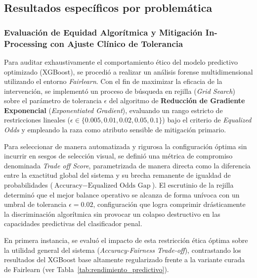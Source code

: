 \documentclass[11pt,a4paper]{article}
\begin{document}
\subsection{Resultados específicos por problemática}
\subsubsection{Evaluación de Equidad Algorítmica y Mitigación In-Processing con Ajuste Clínico de Tolerancia}
\label{subsubsec:resultados_fairness}

Para auditar exhaustivamente el comportamiento ético del modelo predictivo optimizado (XGBoost), se procedió a realizar un análisis forense multidimensional utilizando el entorno \textit{Fairlearn}. Con el fin de maximizar la eficacia de la intervención, se implementó un proceso de búsqueda en rejilla (\textit{Grid Search}) sobre el parámetro de tolerancia $\epsilon$ del algoritmo de \textbf{Reducción de Gradiente Exponencial} (\textit{Exponentiated Gradient}), evaluando un rango estricto de restricciones lineales ($\epsilon \in \{0.005, 0.01, 0.02, 0.05, 0.1\}$) bajo el criterio de \textit{Equalized Odds} y empleando la raza como atributo sensible de mitigación primario.

Para seleccionar de manera automatizada y rigurosa la configuración óptima sin incurrir en sesgos de selección visual, se definió una métrica de compromiso denominada \textit{Trade off Score}, parametrizada de manera directa como la diferencia entre la exactitud global del sistema y su brecha remanente de igualdad de probabilidades ($\text{Accuracy} - \text{Equalized Odds Gap}$). El escrutinio de la rejilla determinó que el mejor balance operativo se alcanza de forma unívoca con un umbral de tolerancia $\epsilon = 0.02$, configuración que logra comprimir drásticamente la discriminación algorítmica sin provocar un colapso destructivo en las capacidades predictivas del clasificador penal.

En primera instancia, se evaluó el impacto de esta restricción ética óptima sobre la utilidad general del sistema (\textit{Accuracy-Fairness Trade-off}), contrastando los resultados del XGBoost base altamente regularizado frente a la variante curada de Fairlearn (ver Tabla~\ref{tab:rendimiento_predictivo}).
\end{document}
